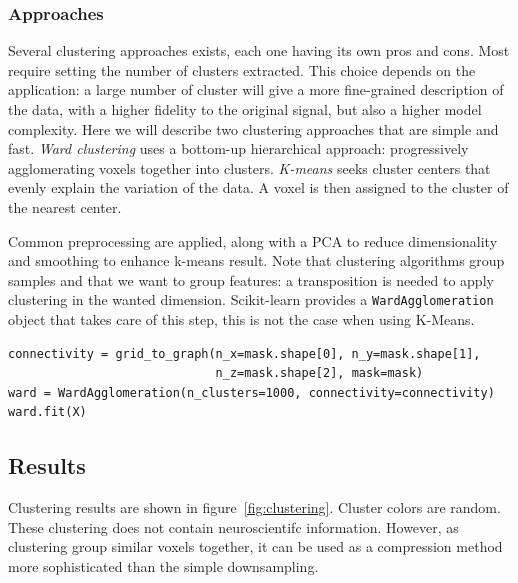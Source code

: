 \documentclass{frontiersSCNS} %
\begin{document}
\subsubsection{Approaches}

Several clustering approaches exists, each one having its own pros and cons.
Most require setting the number of clusters extracted. This choice
depends on the application: a large number of cluster will give a more
fine-grained description of the data, with a higher fidelity to the
original signal, but also a higher model complexity. Here we will
describe two clustering approaches that are simple and fast.
\emph{Ward clustering} uses a bottom-up hierarchical approach:
progressively agglomerating voxels together into clusters.
\emph{K-means} seeks cluster centers that evenly explain the variation of
the data. A voxel is then assigned to the cluster of the nearest
center. 


Common preprocessing are applied, along with a PCA to reduce dimensionality and
smoothing to enhance k-means result. Note that clustering algorithms group
samples and that we want to group features: a transposition is needed to apply
clustering in the wanted dimension. Scikit-learn provides a
\texttt{WardAgglomeration} object that takes care of this step, this is not the
case when using K-Means.


\begin{lstlisting}
connectivity = grid_to_graph(n_x=mask.shape[0], n_y=mask.shape[1],
                             n_z=mask.shape[2], mask=mask)
ward = WardAgglomeration(n_clusters=1000, connectivity=connectivity)
ward.fit(X)
\end{lstlisting}

\subsection{Results}

Clustering results are shown in figure~\ref{fig:clustering}. Cluster colors are
random. These clustering does not contain neuroscientifc information. However,
as clustering group similar voxels together, it can be used as a compression
method more sophisticated than the simple downsampling.
\end{document}
